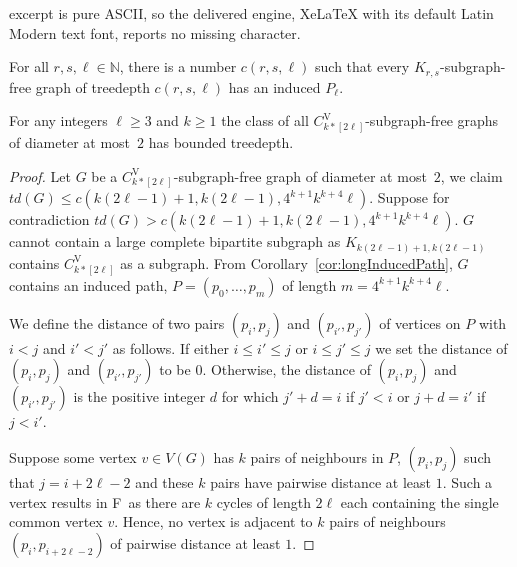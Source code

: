\documentclass[10pt,a4paper]{amsart}
\newcommand{\forbiddenGraph}{F}
\newcommand{\sharedVertex}[1]{C^{\mathrm{V}}_{#1}}
\begin{document}
excerpt is pure ASCII, so the delivered engine, XeLaTeX with its default Latin Modern text font, reports no missing character.
\begin{corollary}\label{cor:longInducedPath}
    For all $r,s,\ell\in \mathbb{N}$, there is a number $c(r,s,\ell)$
    such that every $K_{r,s}$-subgraph-free graph of treedepth $c(r,s,\ell)$ has an induced $P_\ell$.
\end{corollary}

\begin{theorem}  
\label{thm:diam2-CVktimesl}
    For any integers $\ell\geq 3$ and $k\geq 1$ the class of all $\sharedVertex{k*[2\ell]}$-subgraph-free graphs of diameter at most~$2$ has bounded treedepth.
\end{theorem}

\begin{proof}
    Let $G$ be a $\sharedVertex{k*[2\ell]}$-subgraph-free graph of diameter at most~$2$, we claim $td(G) \leq c(k (2\ell-1)+1, k (2\ell-1),4^{k+1}k^{k+4}\ell)$. Suppose for contradiction $td(G) > c(k (2\ell-1)+1, k (2\ell-1),4^{k+1}k^{k+4}\ell)$. $G$ cannot contain a large complete bipartite subgraph as $K_{k (2\ell-1)+1, k (2\ell-1)}$ contains $\sharedVertex{k*[2\ell]}$ as a subgraph. From Corollary~\ref{cor:longInducedPath},  $G$ contains an induced path, $P=(p_0,\dots,p_m)$ 
    of length $m=4^{k+1}k^{k+4}\ell$. 

    We define the distance of two pairs  $(p_i,p_j)$ and $(p_{i'},p_{j'})$ of vertices on $P$ with $i<j$ and $i'<j'$ as follows. If either $i\leq i'\leq j$ or $i\leq j'\leq j$ we set the distance of $(p_i,p_j)$ and $(p_{i'},p_{j'})$ to be $0$. Otherwise, the distance of $(p_i,p_j)$ and $(p_{i'},p_{j'})$ is the positive integer $d$ for which $j'+d=i$ if $j'<i$ or $j+d=i'$ if $j<i'$.
    
    Suppose some vertex $v \in V(G)$ has $k$  pairs of neighbours in $P$, $(p_i,p_j)$ such that $j = i+2\ell-2$ and these $k$ pairs have pairwise distance at least $1$. Such a vertex results in \forbiddenGraph\ as there are $k$ cycles of length $2\ell$ each containing the single common vertex $v$. Hence, no vertex is adjacent to $k$ pairs of neighbours $(p_i,p_{i+2\ell-2})$ of pairwise distance at least $1$.


\end{proof}
\end{document}
